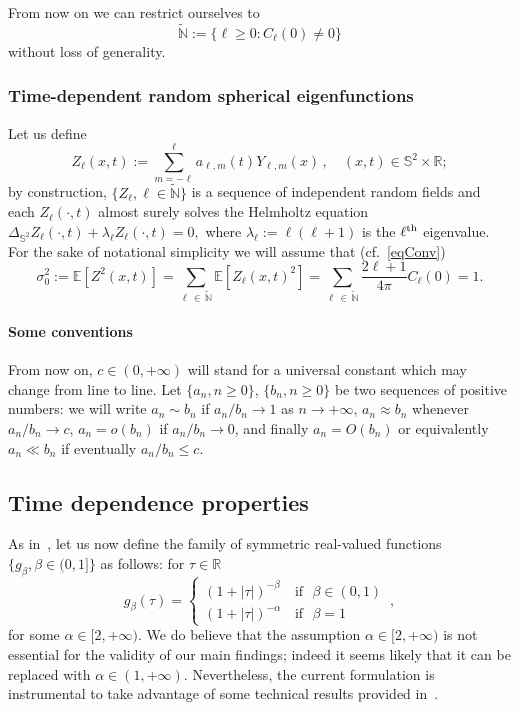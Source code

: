 \documentclass[AHL,Unicode,longabstracts,published]{cedram}
\newcommand{\bbS}{\mathbb{S}}
\newcommand{\bbR}{\mathbb{R}}
\newcommand{\bbE}{\mathbb{E}}
\newcommand{\bbN}{\mathbb{N}}
\begin{document}
From now on we can restrict ourselves to
\begin{equation*}
\widetilde{\bbN} := \{ \ell \ge 0 : C_\ell(0)\ne 0\}
\end{equation*}
without loss of generality.

\subsubsection{Time-dependent random spherical eigenfunctions}
\label{sec-rsh}

Let us define
\begin{equation}\label{eqZell}
Z_\ell(x,t) := \sum_{m=-\ell}^\ell a_{\ell,m}(t) Y_{\ell,m}(x)\,, \quad (x,t)\in \bbS^2\times \bbR;
\end{equation}
by construction, $\{ Z_\ell, \ell\in \widetilde{\bbN}\}$ is a sequence of independent random fields and each $Z_\ell(\cdot, t)$ almost surely solves the Helmholtz equation $\Delta_{\bbS^2} Z_{\ell }(\cdot, t)+\lambda_\ell Z_{\ell }(\cdot, t)=0, $ where $\lambda_\ell:=\ell (\ell +1)$ is the $\ell^{\rm th}$ eigenvalue. For the sake of notational simplicity we will assume that (cf.~\eqref{eqConv})
\begin{equation}\label{somma1}
\sigma _{0}^{2}:=\bbE\left[Z^{2}(x,t)\right] =\sum_{\ell\,\in\,\widetilde{\bbN}} \bbE\left[Z_\ell(x,t)^2\right]=\sum_{\ell\,\in\,\widetilde{
\bbN}}\frac{2\ell +1}{4\pi }C_{\ell }(0)=1.
\end{equation}

\paragraph{Some conventions} 
From now on, $c\in (0, +\infty)$ will stand for a universal constant which may change from line to line. Let $\{ a_n, n\ge 0\}$, $\{ b_n, n\ge 0\}$ be two sequences of positive numbers: we will write $a_n \sim b_n$ if $a_n/b_n \to 1$ as $n\to +\infty$, $ a_n \approx b_n$ whenever $a_n/b_n \to c$, $a_n = o(b_n)$ if $a_n/b_n \to 0$, and finally $a_n = O(b_n)$ or equivalently $a_n \ll b_n$ if eventually $ a_n/b_n \le c$.


\subsection{Time dependence properties}

As in~\cite{MRV:20}, let us now define the family of symmetric real-valued functions $\{ g_\beta, \beta\in (0,1]\}$ as follows: for $\tau\in \bbR$
\begin{equation}\label{gbeta}
g_\beta(\tau) =
\begin{cases}
(1 + |\tau|)^{-\beta}\, & \text{if }\,\, \beta\in (0,1) \\
(1+|\tau|)^{-\alpha}\, & \text{if }\,\, \beta = 1
\end{cases}
\,,
\end{equation}
for some $\alpha \in [2,+\infty)$. We do believe that the assumption $\alpha
\in [2,+\infty)$ is not essential for the validity of our main findings; indeed it seems likely that it can be replaced with $\alpha \in (1, +\infty)$. Nevertheless, the current formulation is instrumental to take advantage of some technical results provided in~\cite{MRV:20}.
\end{document}
